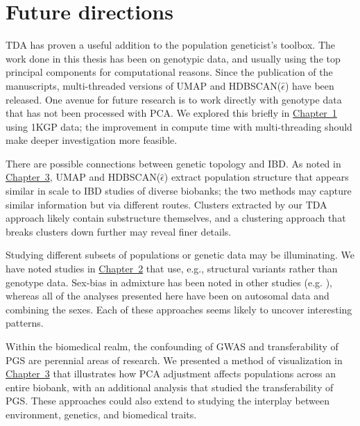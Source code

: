 \section{Future directions}

TDA has proven a useful addition to the population geneticist's toolbox. The work done in this thesis has been on genotypic data, and usually using the top principal components for computational reasons. Since the publication of the manuscripts, multi-threaded versions of UMAP and HDBSCAN($\hat{\epsilon}$) have been released. One avenue for future research is to work directly with genotype data that has not been processed with PCA. We explored this briefly in \hyperref[chap:chapter1]{Chapter~1} using 1KGP data; the improvement in compute time with multi-threading should make deeper investigation more feasible.

There are possible connections between genetic topology and IBD. As noted in \hyperref[chap:chapter3]{Chapter~3}, UMAP and HDBSCAN($\hat{\epsilon}$) extract population structure that appears similar in scale to IBD studies of diverse biobanks; the two methods may capture similar information but via different routes. Clusters extracted by our TDA approach likely contain substructure themselves, and a clustering approach that breaks clusters down further may reveal finer details.

Studying different subsets of populations or genetic data may be illuminating. We have noted studies in \hyperref[chap:chapter2]{Chapter~2} that use, e.g., structural variants rather than genotype data. Sex-bias in admixture has been noted in other studies (e.g. \citep{ongaro_evaluating_2021,korunes_sex-biased_2022,marcheco-teruel_cuba_2014}), whereas all of the analyses presented here have been on autosomal data and combining the sexes. Each of these approaches seems likely to uncover interesting patterns.

Within the biomedical realm, the confounding of GWAS and transferability of PGS are perennial areas of research. We presented a method of visualization in \hyperref[chap:chapter3]{Chapter~3} that illustrates how PCA adjustment affects populations across an entire biobank, with an additional analysis that studied the transferability of PGS. These approaches could also extend to studying the interplay between environment, genetics, and biomedical traits.

